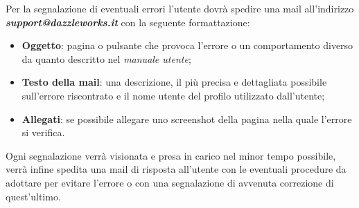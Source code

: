 Per la segnalazione di eventuali errori l'utente dovrà spedire una mail all'indirizzo \textbf{\textit{support@dazzleworks.it}} con la seguente formattazione:
\begin{itemize}
	\item \textbf{Oggetto}: pagina o pulsante che provoca l'errore o un comportamento diverso da quanto descritto nel \textit{manuale utente};
	
	\item \textbf{Testo della mail}: una descrizione, il più precisa e dettagliata possibile sull'errore riscontrato e il nome utente del profilo utilizzato dall'utente;
	
	\item \textbf{Allegati}: se possibile allegare uno screenshot della pagina nella quale l'errore si verifica.
\end{itemize}

\noindent Ogni segnalazione verrà visionata e presa in carico nel minor tempo possibile, verrà infine spedita una mail di risposta all'utente con le eventuali procedure da adottare per evitare l'errore o con una segnalazione di avvenuta correzione di quest'ultimo.